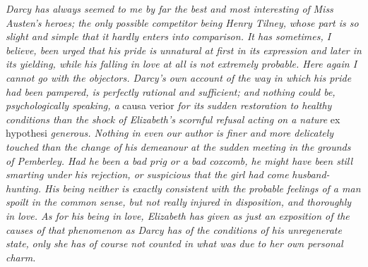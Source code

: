 \documentclass[12pt,openright]{book}
\begin{document}
\textit{Darcy has always seemed to me by far the best and most interesting of}\textit{ }\textit{Miss Austen’s heroes; the only possible competitor being Henry Tilney,}\textit{ }\textit{whose part is so slight and simple that it hardly enters into}\textit{ }\textit{comparison. It has sometimes, I believe, been urged that his pride is}\textit{ }\textit{unnatural at first in its expression and later in its yielding, while}\textit{ }\textit{his falling in love at all is not extremely probable. Here again I}\textit{ }\textit{cannot go with the objectors. Darcy’s own account of the way in which}\textit{ }\textit{his pride had been pampered, is perfectly rational and sufficient; and}\textit{ }\textit{nothing could be, psychologically speaking, a} causa verior \textit{for its}\textit{ }\textit{sudden restoration to healthy conditions than the shock of Elizabeth’s}\textit{ }\textit{scornful refusal acting on a nature} ex hypothesi \textit{generous. Nothing in}\textit{ }\textit{even our author is finer and more delicately touched than the change of}\textit{ }\textit{his demeanour at the sudden meeting in the grounds of Pemberley. Had he}\textit{ }\textit{been a bad prig or a bad coxcomb, he might have been still smarting}\textit{ }\textit{under his rejection, or suspicious that the girl had come}\textit{ }\textit{husband-hunting. His being neither is exactly consistent with the}\textit{ }\textit{probable feelings of a man spoilt in the common sense, but not really}\textit{ }\textit{injured in disposition, and thoroughly in love. As for his being in}\textit{ }\textit{love, Elizabeth has given as just an exposition of the causes of that}\textit{ }\textit{phenomenon as Darcy has of the conditions of his unregenerate state,}\textit{ }\textit{only she has of course not counted in what was due to her own personal}\textit{ }\textit{charm.}
\end{document}
